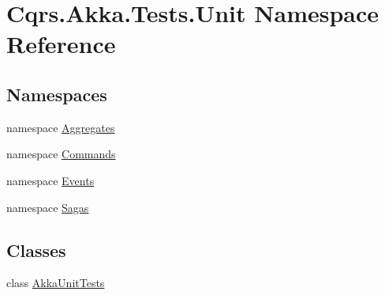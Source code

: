 \hypertarget{namespaceCqrs_1_1Akka_1_1Tests_1_1Unit}{}\section{Cqrs.\+Akka.\+Tests.\+Unit Namespace Reference}
\label{namespaceCqrs_1_1Akka_1_1Tests_1_1Unit}
\subsection*{Namespaces}
\begin{DoxyCompactItemize}
\item 
namespace \hyperlink{namespaceCqrs_1_1Akka_1_1Tests_1_1Unit_1_1Aggregates}{Aggregates}
\item 
namespace \hyperlink{namespaceCqrs_1_1Akka_1_1Tests_1_1Unit_1_1Commands}{Commands}
\item 
namespace \hyperlink{namespaceCqrs_1_1Akka_1_1Tests_1_1Unit_1_1Events}{Events}
\item 
namespace \hyperlink{namespaceCqrs_1_1Akka_1_1Tests_1_1Unit_1_1Sagas}{Sagas}
\end{DoxyCompactItemize}
\subsection*{Classes}
\begin{DoxyCompactItemize}
\item 
class \hyperlink{classCqrs_1_1Akka_1_1Tests_1_1Unit_1_1AkkaUnitTests}{Akka\+Unit\+Tests}
\end{DoxyCompactItemize}
